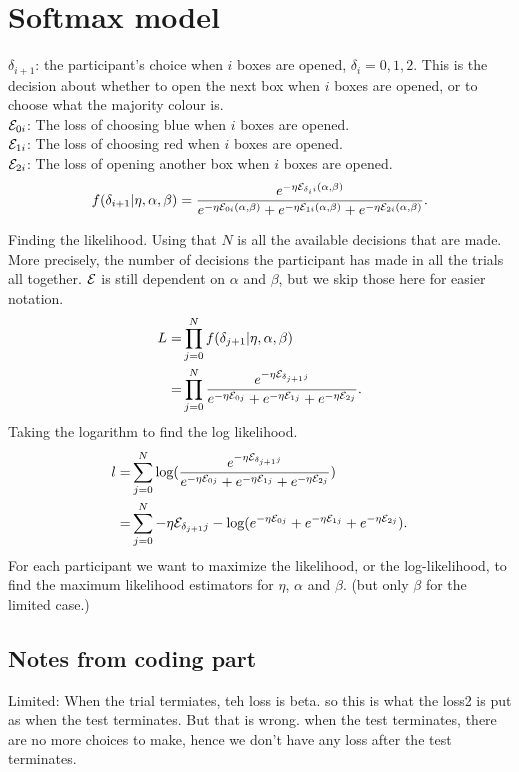 \newpage
\chapter{Softmax model}
$\delta_{i+1}$: the participant's choice when $i$ boxes are opened, $\delta_i = 0,1,2$. This is the decision about whether to open the next box when $i$ boxes are opened, or to choose what the majority colour is.\\
$\mathcal{E} _{0i}$: The loss of choosing blue when $i$ boxes are opened. \\
$\mathcal{E}_{1i}$: The loss of choosing red when $i$ boxes are opened. \\
$\mathcal{E}_{2i}$: The loss of opening another box when $i$ boxes are opened.
\begin{equation*}
    f(\delta_{i+1}|\eta,\alpha,\beta) = \frac{e^{-\eta \mathcal{E}_{\delta_{i}i}(\alpha,\beta)}}
    {e^{-\eta \mathcal{E}_{0i}(\alpha,\beta)} + e^{-\eta \mathcal{E}_{1i}(\alpha,\beta)} + e^{-\eta \mathcal{E}_{2i}(\alpha,\beta)}}.
\end{equation*}

Finding the likelihood. Using that $N$ is all the available decisions that are made. More precisely, the number of decisions the participant has made in all the trials all together. $\mathcal{E}$ is still dependent on $\alpha$ and $\beta$, but we skip those here for easier notation. 
\begin{equation*}
    \begin{aligned}
        L = &\prod_{j=0}^N f(\delta_{j+1}|\eta,\alpha,\beta) \\
        = &\prod_{j=0}^N \frac{e^{-\eta \mathcal{E}_{\delta_{j+1}j}}}
    {e^{-\eta \mathcal{E}_{0j}} + e^{-\eta \mathcal{E}_{1j}} + e^{-\eta \mathcal{E}_{2j}}}.
    \end{aligned}
\end{equation*}
Taking the logarithm to find the log likelihood.
\begin{equation*}
    \begin{aligned}
        l =& \sum_{j=0}^N \text{log}( \frac{e^{-\eta \mathcal{E}_{\delta_{j+1}j}}}
        {e^{-\eta \mathcal{E}_{0j}} + e^{-\eta \mathcal{E}_{1j}} + e^{-\eta \mathcal{E}_{2j}}}) \\
        =& \sum_{j=0}^N -\eta \mathcal{E}_{\delta_{j+1}j} 
        - \text{log}(e^{-\eta \mathcal{E}_{0j}} + e^{-\eta \mathcal{E}_{1j}} + e^{-\eta \mathcal{E}_{2j}}).
    \end{aligned}
\end{equation*}
For each participant we want to maximize the likelihood, or the log-likelihood, to find the maximum likelihood estimators for $\eta$, $\alpha$ and $\beta$. (but only $\beta$ for the limited case.)


\section{Notes from coding part}
Limited: When the trial termiates, teh loss is beta. so this is what the loss2 is put as when the test terminates. But that is wrong. when the test terminates, there are no more choices to make, hence we don't have any loss after the test terminates. 